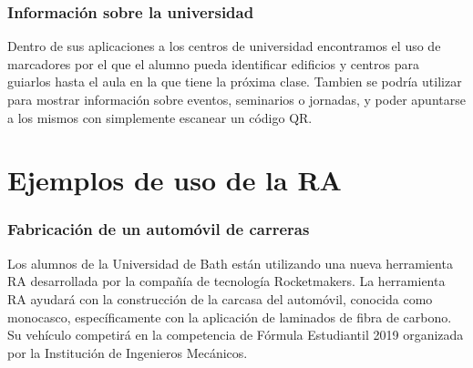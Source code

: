     
\subsubsection{Información sobre la universidad}  

Dentro de sus aplicaciones a los centros de universidad encontramos el uso de marcadores por el que el alumno pueda identificar edificios y centros para guiarlos hasta el aula en la que tiene la próxima clase. Tambien se podría utilizar para mostrar información sobre eventos, seminarios o jornadas, y poder apuntarse a los mismos con simplemente escanear un código QR.




\section{Ejemplos de uso de la RA}

\subsubsection{Fabricación de un automóvil de carreras} 

Los alumnos de la Universidad de Bath están utilizando una nueva herramienta RA desarrollada por la compañía de tecnología Rocketmakers. La herramienta RA ayudará con la construcción de la carcasa del automóvil, conocida como monocasco, específicamente con la aplicación de laminados de fibra de carbono. Su vehículo competirá en la competencia de Fórmula Estudiantil 2019 organizada por la Institución de Ingenieros Mecánicos.

